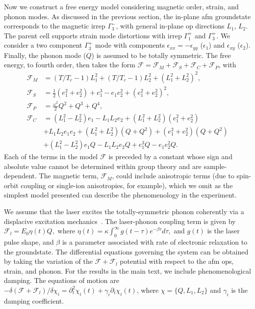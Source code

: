 Now we construct a free energy model considering magnetic order, strain, and phonon modes.
As discussed in the previous section, the in-plane \gls{afm} groundstate corresponds to the magnetic irrep $\Gamma_3^-$, with general in-plane \gls{op} directions $L_1$,  $L_2$.
The parent cell supports  strain mode distortions with irrep $\Gamma_1^+$ and $\Gamma_3^+$.
We consider a two component $\Gamma_3^+$ mode with components $\epsilon_{xx} = - \epsilon_{yy}$ ($\epsilon_1$) and $\epsilon_{xy}$ ($\epsilon_2$).
Finally, the phonon mode ($Q$) is assumed to be totally symmetric.
The free energy, to fourth order, then takes the form $\mathcal F =\mathcal F_M + \mathcal F_S + \mathcal F_C + \mathcal F_{P}$, with
\begin{align}
    \mathcal F_M  & = (T/T_c - 1) L_1^2 + (T/T_c - 1) L_2^2 + (L_1^2 + L_2^2)^2,\\
    \mathcal F_S  & = \frac{1}{2}(e_1^2 + e_2^2)  + e_1^3 -  e_1 e_2^2 + (e_1^2 + e_2^2)^2,\\
    \mathcal F_P  & = \frac{\omega^2}{2}Q^2 +  Q^3 + Q^4 ,\\
    \mathcal F_C  & = \nonumber (L_1^2-L_2^2) e_1 - L_1 L_2 e_2 + (L_1^2+L_2^2)(e^2_1 + e^2_2) \\ \nonumber &+ L_1 L_2 e_1 e_2 + (L_1^2+L_2^2)(Q+Q^2)+(e^2_1 + e^2_2)(Q+Q^2) \nonumber \\ &+(L_1^2 - L_2^2)e_1 Q -L_1 L_2 e_2 Q+e_1^3Q-e_1 e_2^2 Q.
\end{align}
%
Each of the terms in the model $\mathcal F$ is preceded by a constant whose sign and absolute value cannot be determined within group theory and are sample-dependent.
The magnetic term, $\mathcal F_M$, could include anisotropic terms (due to spin-orbit coupling or single-ion anisotropies, for example), which we omit as the simplest model presented can describe the phenomenology in the experiment. 

We assume that the laser excites the totally-symmetric phonon coherently via a displacive excitation mechanics~\citep{zeiger_theory_1992}.
The laser-phonon coupling term is given by $\mathcal F_l = E_0 \eta(t) Q,$ where $\eta(t) = \kappa \int_0^{\infty} g(t-\tau) e^{-\beta \tau} d \tau,$ and $g(t)$ is the laser pulse shape, and $\beta$ is a parameter associated with rate of electronic relaxation to the groundstate.
The differential equations governing the system can be obtained by taking the variation of the $\mathcal F +\mathcal F_l$ potential with respect to the \gls{afm} \glspl{op}, strain, and phonon.
For the results in the main text, we include phenomenological damping.
The equations of motion are $-\delta (\mathcal F +\mathcal F_l)/\delta \chi_i =  \partial^2_t \chi_i(t)+\gamma_i \partial_t\chi_i(t)$, where  $\chi = \{Q, L_1, L_2\}$ and $\gamma_i$ is the damping coefficient.

